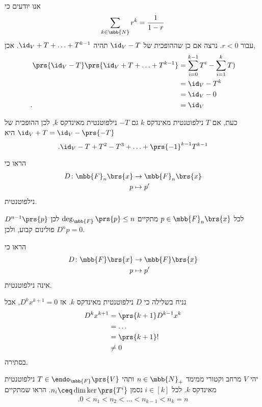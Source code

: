 \documentclass[a4paper,10pt,oneside,openany]{article}
\begin{document}
\begin{solution}
אנו יודעים כי
\[\sum_{k \in \mbb{N}} r^k = \frac{1}{1-r}\]
עבור
$r < 0$.
נרצה אם כן שההופכית של
$\id_V - T$
תהיה
$\id_V + T + \ldots + T^{k-1}$.
אכן,
\begin{align*}
\prs{\id_V - T}\prs{\id_V + T + \ldots + T^{k-1}} &= \sum_{i = 0}^{k-1} T^{i} - \sum_{i = 1}^k T^^i
\\&= \id_V - T^k
\\&= \id_V - 0
\\ \text{.} \hphantom{\prs{\id_V - T}\prs{\id_V + T + \ldots + T^{k-1}}} &= \id_V
\end{align*}

כעת, אם
$T$
נילפוטנטית מאינדקס
$k$
גם
$-T$
נילפוטנטית מאינדקס
$k$,
לכן ההופכית של
$\id_V + T = \id_V - \prs{-T}$
היא
\[\text{.} \id_V - T + T^2 - T^3 + \ldots + \prs{-1}^{k-1} T^{k-1}\]
\end{solution}

\begin{exercise}
הראו כי
\begin{align*}
D \colon \mbb{F}_n\brs{x} &\to \mbb{F}_n\brs{x} \\
p &\mapsto p'
\end{align*}
נילפוטנטית.
\end{exercise}

\begin{solution}
לכל
$p \in \mbb{F}_n\brs{x}$
מתקיים
$\deg_{\mbb{F}}\prs{p} \leq n$
לכן
$D^{n-1}\prs{p}$
פולינום קבוע, ולכן
$D^n p = 0$.
\end{solution}

\begin{exercise}
הראו כי
\begin{align*}
D \colon \mbb{F}\brs{x} &\to \mbb{F}\brs{x} \\
p &\mapsto p'
\end{align*}
אינה נילפוטנטית.
\end{exercise}

\begin{solution}
נניח בשלילה כי
$D$
נילפוטנטית מאינדקס
$k$.
אז
$D^k x^{k+1} = 0$,
אבל
\begin{align*}
D^k x^{k+1} &= \prs{k+1} D^{k-1} x^k
\\&= \ldots
\\&= \prs{k+1}!
\\&\neq 0
\end{align*}
בסתירה.
\end{solution}

\begin{exercise}
יהי
$V$
מרחב וקטורי ממימד
$n \in \mbb{N}_+$
ותהי
$T \in \endo_{\mbb{F}}\prs{V}$
נילפוטנטית מאינדקס
$k$.
לכל
$i \in [k]$
נסמן
$n_i \ceq \dim \ker\prs{T^i}$.
הראו שמתקיים
\begin{align*}
\text{.} 0 < n_1 < n_2 < \ldots < n_{k-1} < n_k = n
\end{align*}
\end{exercise}
\end{document}
